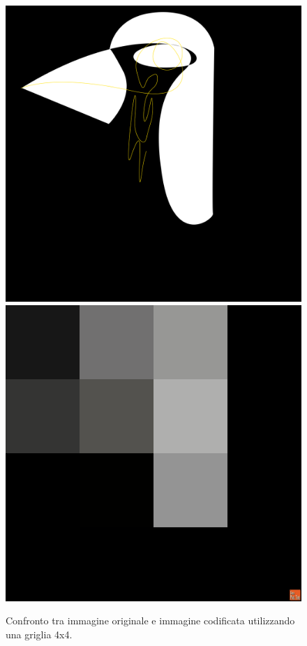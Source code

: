 \begin{figure}[htb] \centering
\includegraphics[scale=0.03]{Pictures/in ricordo del pinguino cameriere.png}
\qquad\qquad
\includegraphics[scale=0.03]{Pictures/canvas8x8.png}
\caption{Confronto tra immagine originale e immagine codificata utilizzando una griglia 4x4.}\label{fig:figura}
\end{figure}

